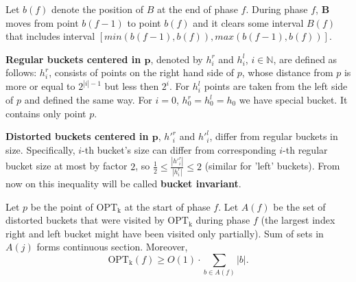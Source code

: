 Let $b(f)$ denote the position of $B$ at the end of phase $f$. During phase 
$f$, \textbf{B} moves from point $b(f-1)$ to point $b(f)$ and it clears some 
interval $B(f)$ that includes interval $[min(b(f-1), b(f)), max(b(f-1), 
b(f))]$.
\begin{definition}
\textbf{Regular buckets centered in $\mathbf{p}$}, denoted by $h^r_i$ and 
$h^l_i$, $i \in \mathbb{N}$,  are defined as follows: 
$h^r_i$, consists of points on the right hand side of $p$, whose 
distance 
from $p$ is more or equal to $2^{|i| - 1}$ but less then $2^i$. 
For $h^l_i$ points are taken from the left side of $p$ and defined the same 
way. For $i=0$, $h^r_0 = h^l_0 = h_0$ we have special bucket. It contains only 
point $p$.

\textbf{Distorted buckets centered in $\mathbf{p}$}, $h'^r_i$ and $h'^l_i$,  
differ from regular buckets in size. Specifically, $i$-th bucket's size can 
differ from corresponding $i$-th regular bucket 
size at most by factor $2$, so $\frac{1}{2} \leq \frac{|h'^r_i|}{|h^r_i|} \leq 
2$ (similar for 'left' buckets). From now on this inequality will be called 
\textbf{bucket invariant}.
\end{definition}
\begin{observe}
Let $p$ be the point of $\mathrm{OPT_k}$ at the start of phase $f$. Let $A(f)$ 
be 
the set of distorted buckets that were visited by $\mathrm{OPT_k}$ during 
phase $f$ 
(the 
largest index right and left bucket might have been visited only partially). 
Sum of sets in 
$A(j)$ 
forms continuous section. Moreover, $$\mathrm{OPT_k}(f) \geq O(1) 
\cdot \sum_{b \in 
A(f)} |b|.$$
\end{observe}
